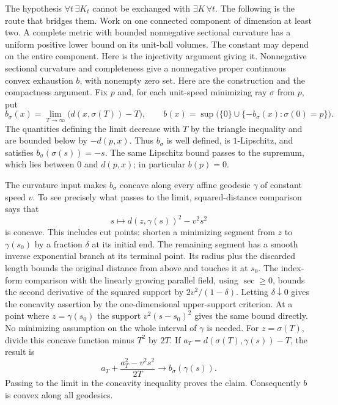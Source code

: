 The hypothesis $\forall t\,\exists K_t$ cannot be exchanged with
$\exists K\,\forall t$.  The following is the route that bridges them.
Work on one connected component of dimension at least two.  A complete
metric with bounded nonnegative sectional curvature has a uniform
positive lower bound on its unit-ball volumes.  The constant may depend
on the entire component.  Here is the injectivity argument giving it.
Nonnegative sectional curvature and completeness give a nonnegative
proper continuous convex exhaustion $b$, with nonempty zero set.
Here are the construction and the compactness argument.  Fix $p$ and,
for each unit-speed minimizing ray $\sigma$ from $p$, put
\[
 b_\sigma(x)=\lim_{T\to\infty}\bigl(d(x,\sigma(T))-T\bigr),
 \qquad
 b(x)=\sup\bigl(\{0\}\cup\{-b_\sigma(x):\sigma(0)=p\}\bigr).
\]
The quantities defining the limit decrease with $T$ by the triangle
inequality and are bounded below by $-d(p,x)$.  Thus $b_\sigma$ is
well defined, is $1$-Lipschitz, and satisfies
$b_\sigma(\sigma(s))=-s$.  The same Lipschitz bound passes to the
supremum, which lies between $0$ and $d(p,x)$; in particular $b(p)=0$.

The curvature input makes $b_\sigma$ concave along every affine
geodesic $\gamma$ of constant speed $v$.  To see precisely what
passes to the limit, squared-distance comparison says that
\[
       s\longmapsto d(z,\gamma(s))^2-v^2s^2
\]
is concave.  This includes cut points: shorten a minimizing segment
from $z$ to $\gamma(s_0)$ by a fraction $\delta$ at its initial end.
The remaining segment has a smooth inverse exponential branch at its
terminal point.  Its radius plus the discarded length bounds the
original distance from above and touches it at $s_0$.  The index-form
comparison with the linearly growing parallel field, using
$\sec\geq0$, bounds the second derivative of the squared support
by $2v^2/(1-\delta)$.  Letting $\delta\downarrow0$ gives the
concavity assertion by the one-dimensional upper-support criterion.
At a point where $z=\gamma(s_0)$ the support
$v^2(s-s_0)^2$ gives the same bound directly.  No minimizing
assumption on the whole interval of $\gamma$ is needed.
For $z=\sigma(T)$, divide this concave function minus $T^2$ by
$2T$.  If $a_T=d(\sigma(T),\gamma(s))-T$, the result is
\[
       a_T+\frac{a_T^2-v^2s^2}{2T}\longrightarrow
       b_\sigma(\gamma(s)).
\]
Passing to the limit in the concavity inequality proves the claim.
Consequently $b$ is convex along all geodesics.

